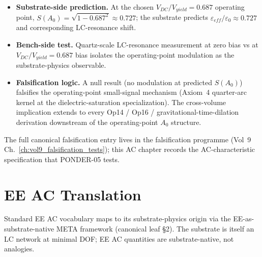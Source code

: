 \begin{itemize}
    \item \textbf{Substrate-side prediction.} At the chosen $V_{DC}/V_{yield} = 0.687$ operating point, $S(A_0) = \sqrt{1 - 0.687^2} \approx 0.727$; the substrate predicts $\varepsilon_{eff}/\varepsilon_0 \approx 0.727$ and corresponding LC-resonance shift.
    \item \textbf{Bench-side test.} Quartz-scale LC-resonance measurement at zero bias vs at $V_{DC}/V_{yield} = 0.687$ bias isolates the operating-point modulation as the substrate-physics observable.
    \item \textbf{Falsification logic.} A null result (no modulation at predicted $S(A_0)$) falsifies the operating-point small-signal mechanism (Axiom~4 quarter-arc kernel at the dielectric-saturation specialization). The cross-volume implication extends to every Op14 / Op16 / gravitational-time-dilation derivation downstream of the operating-point $A_0$ structure.
\end{itemize}

The full canonical falsification entry lives in the falsification programme (Vol~9 Ch.~\ref{ch:vol9_falsification_tests}); this AC chapter records the AC-characteristic specification that PONDER-05 tests.

\section{EE AC Translation}
\label{sec:vol9_ee_ac_translation}

Standard EE AC vocabulary maps to its substrate-physics origin via the EE-as-substrate-native META framework (canonical leaf  \S 2). The substrate is itself an LC network at minimal DOF; EE AC quantities are substrate-native, not analogies.

